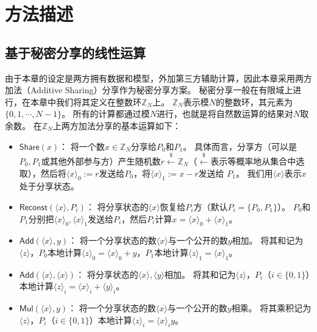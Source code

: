 \section{方法描述}
\subsection{基于秘密分享的线性运算}
由于本章的设定是两方拥有数据和模型，外加第三方辅助计算，因此本章采用两方加法（Additive Sharing）分享作为秘密分享方案。
%
秘密分享一般在有限域上进行，在本章中我们将其定义在整数环$\mathbb Z_N$上。
%
$\mathbb Z_N$表示模$N$的整数环，其元素为$\{0, 1, \cdots, N - 1\}$。
所有的计算都通过模$N$进行，也就是将自然数运算的结果对$N$取余数。
%
在$\mathbb  Z_N$上两方加法分享的基本运算如下：
\begin{itemize}
    \item $\mathsf{Share}(x)$：
    将一个数$x \in \mathbb Z_N$分享给$P_0$和$P_1$。
    具体而言，分享方（可以是$P_0, P_1$或其他外部参与方）产生随机数$r \stackrel{\$}{\gets} \mathbb Z_N$（$\stackrel{\$}{\gets}$表示等概率地从集合中选取），然后将$\langle x \rangle_0 := r$发送给$P_0$，将$\langle x \rangle_1 := x - r$发送给 $P_1$。
    我们用$\langle  x \rangle$表示$x$处于分享状态。

    \item $\mathsf{Reconst}(\langle x \rangle, P_i)$：
    将分享状态的$\langle x \rangle$恢复给$P_i$方（默认$P_i = \{P_0, P_1\}$）。
    $P_0$和$P_1$分别把$\langle x \rangle_0, \langle x \rangle_1$发送给$P_i$，然后$P_i$计算$x = \langle x \rangle_0 + \langle x \rangle_1$。

    \item $\mathsf{Add}(\langle x \rangle, y)$：
    将一个分享状态的数$\langle x \rangle$与一个公开的数$y$相加。
    将其和记为$\langle z \rangle$，$P_0$本地计算$\langle z \rangle_0 = \langle x \rangle_0 + y$，$P_1$本地计算$\langle z \rangle_1 = \langle x \rangle_1$。
    
    \item $\mathsf{Add}(\langle x \rangle, \langle x \rangle)$：
    将分享状态的$\langle x \rangle, \langle y \rangle$相加。
    将其和记为$\langle z \rangle$，$P_i$（$i\in \{0, 1\}$）本地计算$\langle z\rangle_i = \langle x \rangle_i + \langle y \rangle_i$。
    
    \item $\mathsf{Mul}(\langle x \rangle, y)$：
    将一个分享状态的数$\langle x \rangle$与一个公开的数$y$相乘。
    将其乘积记为$\langle z \rangle$，$P_i$（$i\in \{0, 1\}$）本地计算$\langle z\rangle_i = \langle x \rangle_i y$。


\end{itemize}

